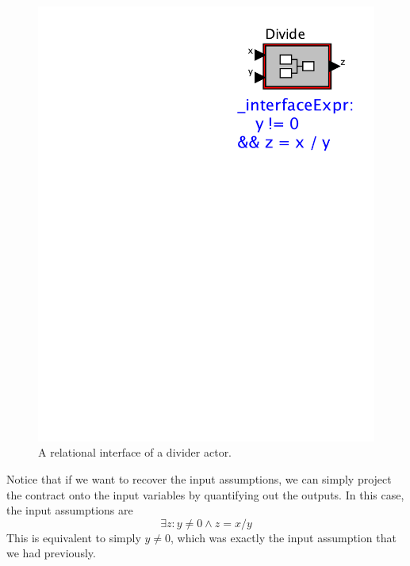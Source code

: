 \documentclass[preprint,11pt]{sigplanconf}
\begin{document}
\begin{figure}[htbp]
\centering
\includegraphics[scale=0.6]{figs/Divide2} 
\caption{A relational interface of a divider actor.}
\label{fig:dividerNew}
\end{figure}

Notice that if we want to recover the input assumptions, we can simply project
the contract onto the input variables by quantifying out the outputs.
In this case, the input assumptions are 
\[
\exists z : y \ne 0 \wedge z = x / y 
\]
This is equivalent to simply $y \ne 0$, which was exactly the input assumption
that we had previously.
\end{document}
